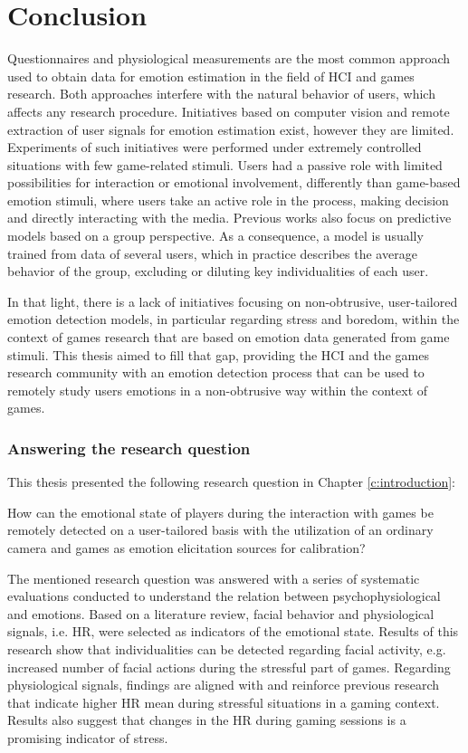 \chapter{Conclusion}
\label{ch:conclusion}

Questionnaires and physiological measurements are the most common approach used to obtain data for emotion estimation in the field of HCI and games research. Both approaches interfere with the natural behavior of users, which affects any research procedure. Initiatives based on computer vision and remote extraction of user signals for emotion estimation exist, however they are limited. Experiments of such initiatives were performed under extremely controlled situations with few game-related stimuli. Users had a passive role with limited possibilities for interaction or emotional involvement, differently than game-based emotion stimuli, where users take an active role in the process, making decision and directly interacting with the media. Previous works also focus on predictive models based on a group perspective. As a consequence, a model is usually trained from data of several users, which in practice describes the average behavior of the group, excluding or diluting key individualities of each user.

In that light, there is a lack of initiatives focusing on non-obtrusive, user-tailored emotion detection models, in particular regarding stress and boredom, within the context of games research that are based on emotion data generated from game stimuli. This thesis aimed to fill that gap, providing the HCI and the games research community with an emotion detection process that can be used to remotely study users emotions in a non-obtrusive way within the context of games.

\subsection{Answering the research question}

This thesis presented the following research question in Chapter \ref{c:introduction}:

\begin{fquote}
How can the emotional state of players during the interaction with games be remotely detected on a user-tailored basis with the utilization of an ordinary camera and games as emotion elicitation sources for calibration?
\end{fquote}

The mentioned research question was answered with a series of systematic evaluations conducted to understand the relation between psychophysiological and emotions. Based on a literature review, facial behavior and physiological signals, i.e. HR, were selected as indicators of the emotional state. Results of this research show that individualities can be detected regarding facial activity, e.g. increased number of facial actions during the stressful part of games. Regarding physiological signals, findings are aligned with and reinforce previous research that indicate higher HR mean during stressful situations in a gaming context. Results also suggest that changes in the HR during gaming sessions is a promising indicator of stress.

